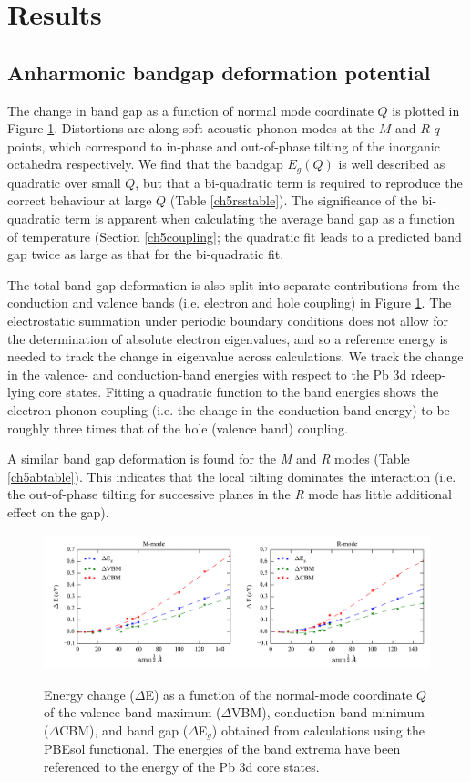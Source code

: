 \section{Results}
\subsection{Anharmonic bandgap deformation potential}
The change in band gap as a function of normal mode coordinate $Q$ is plotted in Figure \ref{ch5figs1}. Distortions are along soft acoustic phonon modes at the $M$ and $R$ $q$-points, which correspond to in-phase and out-of-phase tilting of the inorganic octahedra respectively.
We find that the bandgap $E_g(Q)$ is well described as quadratic over small $Q$, but that a bi-quadratic term is required to reproduce the correct behaviour at large $Q$ (Table \ref{ch5rsstable}). 
The significance of the bi-quadratic term is apparent when calculating the average band gap as a function of temperature (Section \ref{ch5coupling}; the quadratic fit leads to a predicted band gap twice as large as that for the bi-quadratic fit.

The total band gap deformation is also split into separate contributions from the conduction and valence bands (i.e. electron and hole coupling) in Figure \ref{ch5figs1}.
The electrostatic summation under periodic boundary conditions 
does not allow for the determination of absolute electron eigenvalues, and so a reference energy is needed to track the change in eigenvalue across calculations.  
We track the change in the valence- 
and conduction-band energies with respect to the Pb 3d rdeep-lying core states.
Fitting a quadratic function to the band energies shows the electron-phonon coupling (i.e. the change in the conduction-band energy)
to be roughly three times that of the hole (valence band) coupling. 

A similar band gap deformation is found for the \textit{M} and \textit{R} modes (Table \ref{ch5abtable}). This indicates that the local tilting dominates the interaction (i.e. the out-of-phase tilting for successive planes in the \textit{R} mode has little additional effect on the gap).

\begin{figure}[h]
\includegraphics[width=\textwidth]{figures/ch5/fig_s3.png} \label{ch5figs1}
\caption{
Energy change ($\Delta$E) as a function of the normal-mode coordinate $Q$ of the valence-band maximum ($\Delta$VBM), conduction-band minimum ($\Delta$CBM), and band gap ($\Delta$E$_g$) obtained from calculations using the PBEsol functional.
The energies of the band extrema have been referenced to the energy of the Pb 3d core states.
}
\end{figure}


